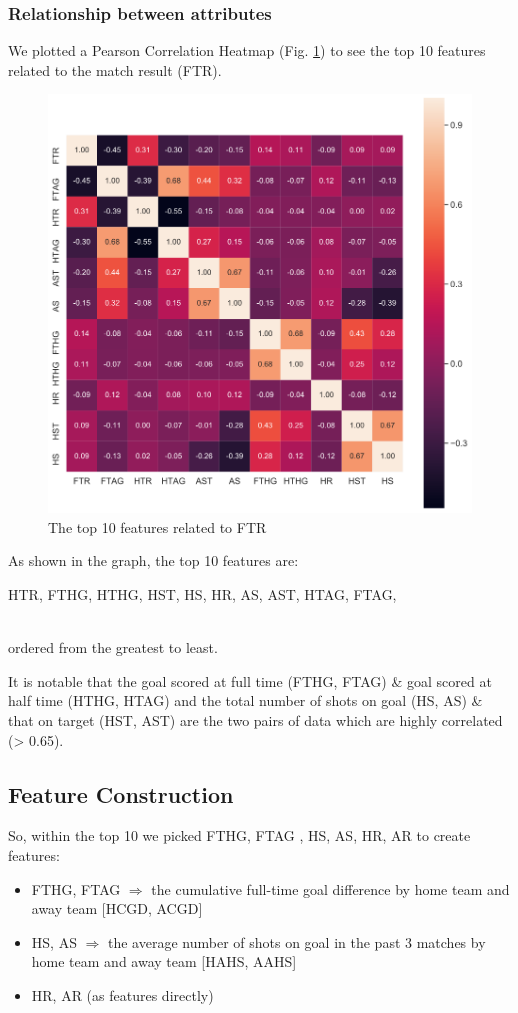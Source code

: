 \documentclass{article}
\begin{document}
\subsubsection{Relationship between attributes}
We plotted a Pearson Correlation Heatmap (Fig. \ref{fig:top-10-features-in-raw-data}) to see the top 10 features related to the match result (FTR).

\begin{figure}[ht]
\centering
\includegraphics[scale=0.3]{graphs/top-10-features-in-raw-data.png}
\caption{The top 10 features related to FTR}
\label{fig:top-10-features-in-raw-data}
\end{figure}

As shown in the graph, the top 10 features are: \\
\centerline{HTR,  FTHG, HTHG, HST, HS, HR, AS, AST, HTAG, FTAG,}	\\
ordered from the greatest to least.

It is notable that the goal scored at full time (FTHG, FTAG)  \& goal scored at half time (HTHG, HTAG) and
the total number of shots on goal (HS, AS)  \& that on target (HST, AST) are the two pairs of data which are highly correlated (> 0.65).

\subsection{Feature Construction}
So, within the top 10 we picked FTHG, FTAG , HS, AS,  HR, AR to create features:
\begin{itemize}
\item FTHG, FTAG $\Rightarrow$ the cumulative full-time goal difference by home team and away team [HCGD, ACGD]
\item HS, AS $\Rightarrow$  the average number of shots on goal in the past 3 matches by home team and away team [HAHS, AAHS]
\item HR, AR (as features directly) 
\end{itemize}
\end{document}
